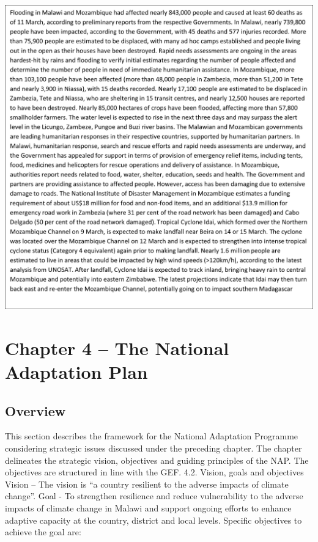 \documentclass[
]{book}
\begin{document}
\includegraphics{images/hazard_box.png}

\hypertarget{chapter-4-the-national-adaptation-plan}{%
\chapter{Chapter 4 -- The National Adaptation Plan}\label{chapter-4-the-national-adaptation-plan}}

\hypertarget{overview-1}{%
\section{Overview}\label{overview-1}}

This section describes the framework for the National Adaptation Programme considering strategic issues discussed under the preceding chapter. The chapter delineates the strategic vision, objectives and guiding principles of the NAP. The objectives are structured in line with the GEF.
4.2. Vision, goals and objectives
Vision -- The vision is ``a country resilient to the adverse impacts of climate change''.
Goal - To strengthen resilience and reduce vulnerability to the adverse impacts of climate change in Malawi and support ongoing efforts to enhance adaptive capacity at the country, district and local levels.
Specific objectives to achieve the goal are:
\end{document}
